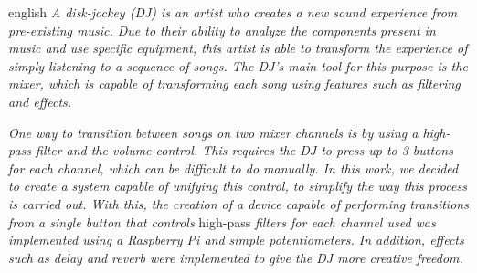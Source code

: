 \begin{resumo}[Abstract]
  \begin{otherlanguage*}{english}
  \textit{A disk-jockey (DJ) is an artist who creates a new sound experience from pre-existing music. Due to their ability to analyze the components present in music and use specific equipment, this artist is able to transform the experience of simply listening to a sequence of songs.
The DJ's main tool for this purpose is the mixer, which is capable of transforming each song using features such as filtering and effects.}

\textit{One way to transition between songs on two mixer channels is by using a high-pass filter and the volume control. This requires the DJ to press up to 3 buttons for each channel, which can be difficult to do manually. In this work, we decided to create a system capable of unifying this control, to simplify the way this process is carried out. With this, the creation of a device capable of performing transitions from a single button that controls} high-pass \textit{filters for each channel used was implemented using a Raspberry Pi and simple potentiometers. In addition, effects such as delay and reverb were implemented to give the DJ more creative freedom.}


\end{otherlanguage*}
\end{resumo}
